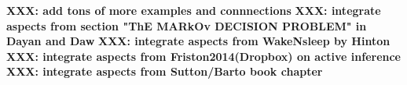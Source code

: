 \documentclass[10pt,letterpaper]{article}
\def\W{\mathbf{W}}
\begin{document}

\textbf{XXX: add tons of more examples and connnections}
\textbf{XXX: integrate aspects from section "ThE MARkOv DECISION PROBLEM" in Dayan and Daw}
\textbf{XXX: integrate aspects from WakeNsleep by Hinton}
\textbf{XXX: integrate aspects from Friston2014(Dropbox) on active inference}
\textbf{XXX: integrate aspects from Sutton/Barto book chapter}
\end{document}
